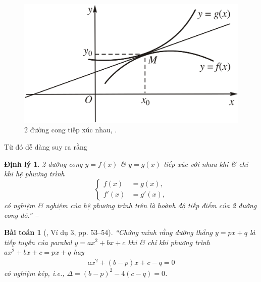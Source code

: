 \documentclass{article}
\numberwithin{equation}{section}
\newtheorem{baitoan}{Bài toán}[section]
\newtheorem{dinhly}{Định lý}[section]
\begin{document}
\begin{figure}[H]
	\centering
	\includegraphics[scale=0.15]{2_duong_cong_tiep_xuc}
	\caption{2 đường cong tiếp xúc nhau, \cite[Hình 1.20, p. 52]{SGK_Toan_12_giai_tich_nang_cao}.}
	\label{fig:2_duong_cong_tiep_xuc}
\end{figure}
Từ đó dễ dàng suy ra rằng

\begin{dinhly}
	2 đường cong $y = f(x)$ \& $y = g(x)$ tiếp xúc với nhau khi \& chỉ khi hệ phương trình
	\begin{equation*}
		\left\{\begin{split}
			f(x) &= g(x),\\
			f'(x) &= g'(x),
		\end{split}\right.
	\end{equation*}
	có nghiệm \& nghiệm của hệ phương trình trên là hoành độ tiếp điểm của 2 đường cong đó.'' -- \cite[p. 52]{SGK_Toan_12_giai_tich_nang_cao}
\end{dinhly}

\begin{baitoan}[\cite{SGK_Toan_12_giai_tich_nang_cao}, Ví dụ 3, pp. 53--54]
	``Chứng minh rằng đường thẳng $y = px + q$ là tiếp tuyến của parabol $y = ax^2 + bx + c$ khi \& chỉ khi phương trình $ax^2 + bx + c = px + q$ hay
	\begin{align}
		\label{SGK_Toan_12_giai_tich_nang_cao (3) p. 54}
		ax^2 + (b - p)x + c - q = 0
	\end{align}
	có nghiệm kép, i.e., $\Delta = (b - p)^2 - 4(c - q) = 0$.
\end{baitoan}
\end{document}
